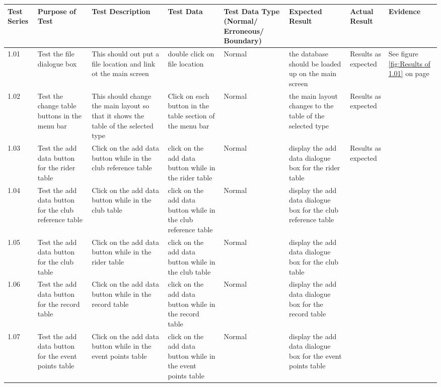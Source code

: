 \begin{landscape}
\begin{center}
    \begin{longtable}{|p{1.5cm}|p{2.5cm}|p{2.5cm}|p{2cm}|p{2cm}|p{2cm}|p{2cm}|p{2cm}|}
        \hline
        \textbf{Test Series} & \textbf{Purpose of Test} & \textbf{Test Description} & \textbf{Test Data} & \textbf{Test Data Type (Normal/ Erroneous/ Boundary)} & \textbf{Expected Result} & \textbf{Actual Result} & \textbf{Evidence}\\ \hline
        1.01 & Test the file dialogue box & This should out put a file location and link ot the main screen & double click on file location & Normal & the database should be loaded up on the main screen & Results as expected & See figure  \ref{fig:Results of 1.01} on page \pageref{fig:Results of 1.01} \\ \hline
        1.02 & Test the change table buttons in the menu bar  & This should change the main layout so that it shows the table of the selected type & Click on each button in the table section of the menu bar & Normal & the main layout changes to the table of the selected type & Results as expected & \\ \hline
        1.03 & Test the add data button for the rider table & Click on the add data button while in the club reference table & click on the add data button while in the rider table & Normal & display the add data dialogue box for the rider table & Results as expected & \\ \hline
        1.04 & Test the add data button for the club reference table & Click on the add data button while in the club table & click on the add data button while in the club reference table & Normal & display the add data dialogue box for the club reference table & & \\ \hline
        1.05 & Test the add data button for the club  table & Click on the add data button while in the rider table & click on the add data button while in the club table & Normal & display the add data dialogue box for the club  table & & \\ \hline
        \rowcolor{DarkGrey}1.06 & Test the add data button for the record  table & Click on the add data button while in the record table & click on the add data button while in the record table & Normal & display the add data dialogue box for the record  table & & \\ \hline
        \rowcolor{DarkGrey}1.07 & Test the add data button for the event points  table & Click on the add data button while in the event points table & click on the add data button while in the event points table & Normal & display the add data dialogue box for the event points  table & & \\ \hline

\end{longtable}
\end{center}
\end{landscape}
